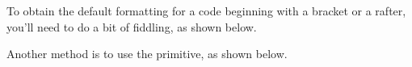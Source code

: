 \documentclass{tutodoc}
\begin{document}
\medskip

\begin{tdocwarn}
    To obtain the default formatting for a code beginning with a bracket or a rafter, you'll need to do a bit of fiddling, as shown below.

    \smallskip

    Another method is to use the  primitive, as shown below.
\end{tdocwarn}
\end{document}
